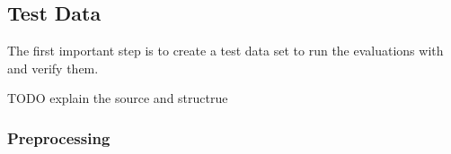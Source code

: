\subsection{Test Data}

The first important step is to create a test data set to run the evaluations with and verify them.

TODO explain the source and structrue

\subsubsection{Preprocessing}

